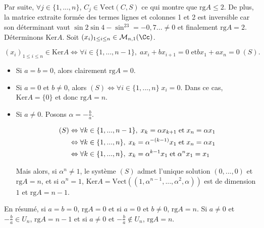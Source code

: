 {{Par suite, $\forall j\in\{1,...,n\}$, $C_j\in\mbox{Vect}(C,S)$ ce qui montre que $\mbox{rg}A\leq2$. De plus, la matrice extraite formée des termes lignes et colonnes 1 et 2 est inversible car son déterminant vaut
$\sin2\sin4-\sin^23=-0,7...\neq0$ et finalement $\mbox{rg}A=2$.
Déterminons $\mbox{Ker}A$. Soit $(x_i)_{1\leq i\leq n}\in\mathcal{M}_{n,1}(\Cc)$.

$$(x_i)_{1\leq i\leq n}\in\mbox{Ker}A\Leftrightarrow\forall i\in\{1,...,n-1\},\;ax_i+bx_{i+1}=0\;\mbox{et}bx_1+ax_n=0\;(S).$$

\begin{itemize}
\item[1er cas.] Si $a=b=0$, alors clairement $\mbox{rg}A=0$.
\item[2ème cas.] Si $a=0$ et $b\neq0$, alors $(S)\Leftrightarrow\forall i\in\{1,...,n\}\;x_i=0$. Dans ce cas, $\mbox{Ker}A=\{0\}$ et donc $\mbox{rg}A=n$.
\item[3ème cas.] Si $a\neq0$. Posons $\alpha=-\frac{b}{a}$.

\begin{align*}\ensuremath
(S)&\Leftrightarrow\forall k\in\{1,...,n-1\},\;x_k=\alpha x_{k+1}\;\mbox{et}\;x_n=\alpha x_1\\
 &\Leftrightarrow\forall k\in\{1,...,n\},\;x_k=\alpha^{-(k-1)}x_1\;\mbox{et}\;x_n=\alpha x_1\\
 &\Leftrightarrow\forall k\in\{1,...,n\},\;x_k=\alpha^{k-1}x_1\;\mbox{et}\;\alpha^n x_1=x_1
\end{align*}

Mais alors, si $\alpha^n\neq1$, le système $(S)$ admet l'unique solution $(0,...,0)$ et $\mbox{rg}A=n$, et si $\alpha^n=1$, $\mbox{Ker}A=\mbox{Vect}((1,\alpha^{n-1},...,\alpha^2,\alpha))$ est de dimension $1$ et $\mbox{rg}A=n-1$.
\end{itemize}

En résumé, si $a=b=0$, $\mbox{rg}A=0$ et si $a=0$ et $b\neq0$, $\mbox{rg}A=n$. Si $a\neq0$ et $-\frac{b}{a}\in U_n$, $\mbox{rg}A=n-1$ et si $a\neq0$ et $-\frac{b}{a}\notin U_n$, $\mbox{rg}A=n$.
}
}
